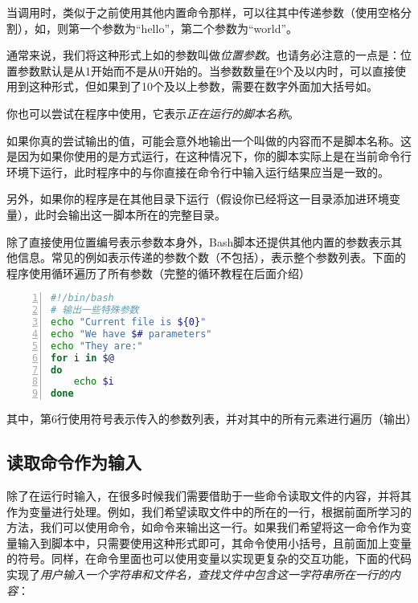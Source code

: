 当调用时，类似于之前使用其他内置命令那样，可以往其中传递参数（使用空格分割），如，则第一个参数为“hello”，第二个参数为“world”。

\begin{attention}
    通常来说，我们将这种形式上如的参数叫做\emph{位置参数}。也请务必注意的一点是：位置参数默认是从1开始而不是从0开始的。当参数数量在9个及以内时，可以直接使用到这种形式，但如果到了10个及以上参数，需要在数字外面加大括号如。

    你也可以尝试在程序中使用，它表示\emph{正在运行的脚本名称}。
\end{attention}

\begin{extend}
    如果你真的尝试输出的值，可能会意外地输出一个叫做的内容而不是脚本名称。这是因为如果你使用的是方式运行，在这种情况下，你的脚本实际上是在当前命令行环境下运行，此时程序中的与你直接在命令行中输入运行结果应当是一致的。

    另外，如果你的程序是在其他目录下运行（假设你已经将这一目录添加进环境变量），此时会输出这一脚本所在的完整目录。
\end{extend}

除了直接使用位置编号表示参数本身外，Bash脚本还提供其他内置的参数表示其他信息。常见的例如\code{\$\#}表示传递的参数个数（不包括），\code{\$\@}表示整个参数列表。下面的程序使用循环遍历了所有参数（完整的循环教程在后面介绍）

\begin{lstlisting}[language=bash,caption=special\_parameters,numbers=left]
#!/bin/bash
# 输出一些特殊参数
echo "Current file is ${0}"
echo "We have $# parameters"
echo "They are:"
for i in $@ 
do
    echo $i
done
\end{lstlisting}

其中，第6行使用\code{\$\@}符号表示传入的参数列表，并对其中的所有元素进行遍历（输出）

\subsection{读取命令作为输入}\label{subsec:输入-读取命令作为输入}

除了在运行时输入，在很多时候我们需要借助于一些命令读取文件的内容，并将其作为变量进行处理。例如，我们希望读取文件中的所在的一行，根据前面所学习的方法，我们可以使用命令，如命令来输出这一行。如果我们希望将这一命令作为变量输入到脚本中，只需要使用这种形式即可，其命令使用小括号，且前面加上变量的\code{\$}符号。同样，在命令里面也可以使用变量以实现更复杂的交互功能，下面的代码实现了\emph{用户输入一个字符串和文件名，查找文件中包含这一字符串所在一行的内容}：

